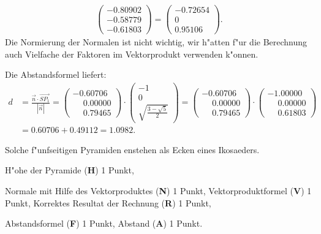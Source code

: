\begin{loesung}
\begin{teilaufgaben}
\begin{align*}
\begin{pmatrix}
  -0.80902\\
  -0.58779\\
  -0.61803
\end{pmatrix}
=\begin{pmatrix}
  -0.72654\\
   0\\
   0.95106    
\end{pmatrix}.
\end{align*}
Die Normierung der Normalen ist nicht wichtig, wir h"atten f"ur die
Berechnung auch Vielfache der Faktoren im Vektorprodukt verwenden k"onnen.
\item
Die Abstandsformel liefert:
\begin{align*}
d&=\frac{\vec n\cdot \overrightarrow{SP_1}}{|\vec n|}
=
\begin{pmatrix}
-0.60706\\
\phantom{-}0.00000\\
\phantom{-}0.79465
\end{pmatrix}
\cdot
\begin{pmatrix}
-1\\0\\\sqrt{\frac{3-\sqrt{5}}2}
\end{pmatrix}
=
\begin{pmatrix}
-0.60706\\
\phantom{-}0.00000\\
\phantom{-}0.79465
\end{pmatrix}
\cdot
\begin{pmatrix}
-1.00000\\
\phantom{-}0.00000\\
\phantom{-}0.61803
\end{pmatrix}
\\
&=
0.60706+0.49112
=
1.0982.
\end{align*}
\end{teilaufgaben}
\end{loesung}

\begin{diskussion}
Solche f"unfseitigen Pyramiden enstehen als Ecken eines Ikosaeders.
\end{diskussion}

\begin{bewertung}
\begin{teilaufgaben}
\item
H"ohe der Pyramide ({\bf H}) 1 Punkt,
\item
Normale mit Hilfe des Vektorproduktes ({\bf N}) 1 Punkt,
Vektorproduktformel ({\bf V}) 1 Punkt,
Korrektes Resultat der Rechnung ({\bf R}) 1 Punkt,
\item
Abstandsformel ({\bf F}) 1 Punkt,
Abstand ({\bf A}) 1 Punkt.
\end{teilaufgaben}
\end{bewertung}




